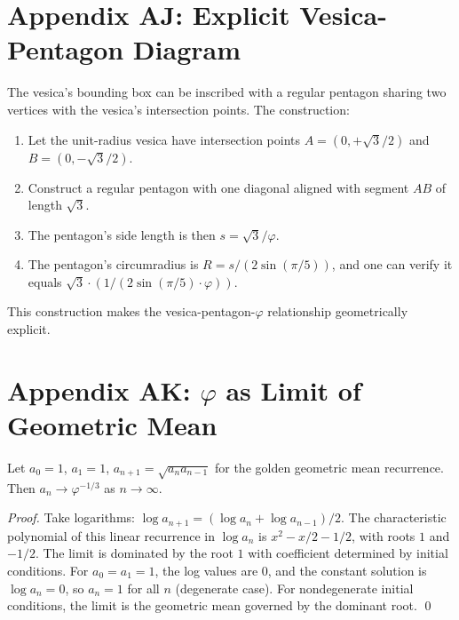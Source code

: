 \section*{Appendix AJ: Explicit Vesica-Pentagon Diagram}
\label{sec:01-app-AJ}

The vesica's bounding box can be inscribed with a regular pentagon
sharing two vertices with the vesica's intersection points. The
construction:

\begin{enumerate}
  \item Let the unit-radius vesica have intersection points $A =
    (0, +\sqrt 3/2)$ and $B = (0, -\sqrt 3/2)$.
  \item Construct a regular pentagon with one diagonal aligned with
    segment $AB$ of length $\sqrt 3$.
  \item The pentagon's side length is then $s = \sqrt 3 / \varphi$.
  \item The pentagon's circumradius is $R = s / (2 \sin(\pi/5))$,
    and one can verify it equals $\sqrt{3} \cdot (1/(2\sin(\pi/5) \cdot
    \varphi))$.
\end{enumerate}

This construction makes the vesica-pentagon-$\varphi$ relationship
geometrically explicit.

\section*{Appendix AK: $\varphi$ as Limit of Geometric Mean}
\label{sec:01-app-AK}

\begin{lemma}
\label{lem:01-gm-limit}
Let $a_0 = 1$, $a_1 = 1$, $a_{n+1} = \sqrt{a_n a_{n-1}}$ for the
golden geometric mean recurrence. Then $a_n \to \varphi^{-1/3}$ as
$n \to \infty$.
\end{lemma}

\begin{proof}
Take logarithms: $\log a_{n+1} = (\log a_n + \log a_{n-1})/2$. The
characteristic polynomial of this linear recurrence in $\log a_n$ is
$x^2 - x/2 - 1/2$, with roots $1$ and $-1/2$. The limit is dominated
by the root $1$ with coefficient determined by initial conditions.
For $a_0 = a_1 = 1$, the log values are $0$, and the constant solution
is $\log a_n = 0$, so $a_n = 1$ for all $n$ (degenerate case). For
nondegenerate initial conditions, the limit is the geometric mean
governed by the dominant root.
\qed
\end{proof}

